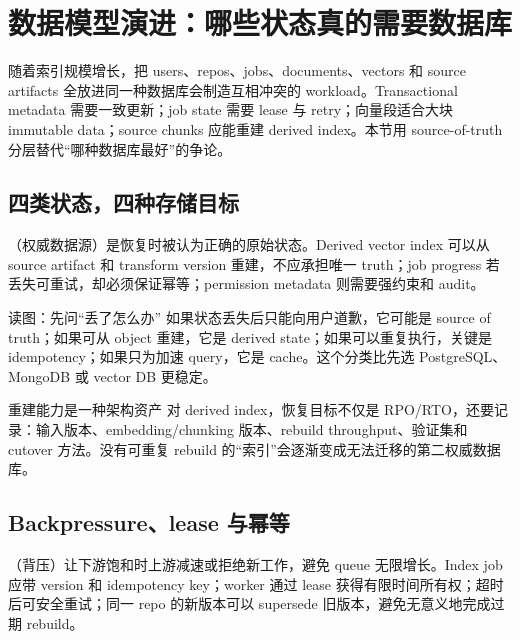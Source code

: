 \section{数据模型演进：哪些状态真的需要数据库}

随着索引规模增长，把 users、repos、jobs、documents、vectors 和 source artifacts 全放进同一种数据库会制造互相冲突的 workload。Transactional metadata 需要一致更新；job state 需要 lease 与 retry；向量段适合大块 immutable data；source chunks 应能重建 derived index。本节用 source-of-truth 分层替代“哪种数据库最好”的争论。

\subsection{四类状态，四种存储目标}

（权威数据源）是恢复时被认为正确的原始状态。Derived vector index 可以从 source artifact 和 transform version 重建，不应承担唯一 truth；job progress 若丢失可重试，却必须保证幂等；permission metadata 则需要强约束和 audit。


\begin{knowledgebox}{读图：先问“丢了怎么办”}
如果状态丢失后只能向用户道歉，它可能是 source of truth；如果可从 object 重建，它是 derived state；如果可以重复执行，关键是 idempotency；如果只为加速 query，它是 cache。这个分类比先选 PostgreSQL、MongoDB 或 vector DB 更稳定。
\end{knowledgebox}

\begin{importantbox}{重建能力是一种架构资产}
对 derived index，恢复目标不仅是 RPO/RTO，还要记录：输入版本、embedding/chunking 版本、rebuild throughput、验证集和 cutover 方法。没有可重复 rebuild 的“索引”会逐渐变成无法迁移的第二权威数据库。
\end{importantbox}

\subsection{Backpressure、lease 与幂等}

（背压）让下游饱和时上游减速或拒绝新工作，避免 queue 无限增长。Index job 应带 version 和 idempotency key；worker 通过 lease 获得有限时间所有权；超时后可安全重试；同一 repo 的新版本可以 supersede 旧版本，避免无意义地完成过期 rebuild。

